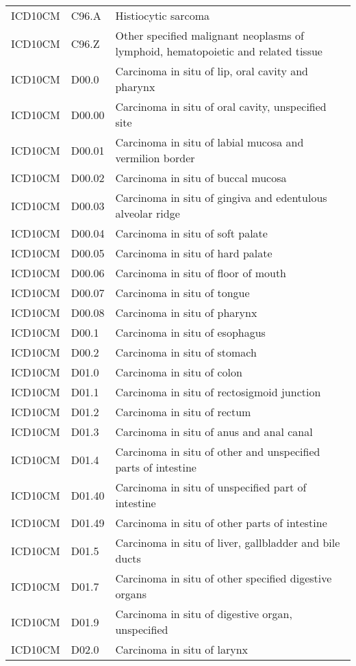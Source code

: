 \begin{longtable}{p{}p{}p{}}
  ICD10CM & C96.A & Histiocytic sarcoma \\ 
  ICD10CM & C96.Z & Other specified malignant neoplasms of lymphoid, hematopoietic and related tissue \\ 
  ICD10CM & D00.0 & Carcinoma in situ of lip, oral cavity and pharynx \\ 
  ICD10CM & D00.00 & Carcinoma in situ of oral cavity, unspecified site \\ 
  ICD10CM & D00.01 & Carcinoma in situ of labial mucosa and vermilion border \\ 
  ICD10CM & D00.02 & Carcinoma in situ of buccal mucosa \\ 
  ICD10CM & D00.03 & Carcinoma in situ of gingiva and edentulous alveolar ridge \\ 
  ICD10CM & D00.04 & Carcinoma in situ of soft palate \\ 
  ICD10CM & D00.05 & Carcinoma in situ of hard palate \\ 
  ICD10CM & D00.06 & Carcinoma in situ of floor of mouth \\ 
  ICD10CM & D00.07 & Carcinoma in situ of tongue \\ 
  ICD10CM & D00.08 & Carcinoma in situ of pharynx \\ 
  ICD10CM & D00.1 & Carcinoma in situ of esophagus \\ 
  ICD10CM & D00.2 & Carcinoma in situ of stomach \\ 
  ICD10CM & D01.0 & Carcinoma in situ of colon \\ 
  ICD10CM & D01.1 & Carcinoma in situ of rectosigmoid junction \\ 
  ICD10CM & D01.2 & Carcinoma in situ of rectum \\ 
  ICD10CM & D01.3 & Carcinoma in situ of anus and anal canal \\ 
  ICD10CM & D01.4 & Carcinoma in situ of other and unspecified parts of intestine \\ 
  ICD10CM & D01.40 & Carcinoma in situ of unspecified part of intestine \\ 
  ICD10CM & D01.49 & Carcinoma in situ of other parts of intestine \\ 
  ICD10CM & D01.5 & Carcinoma in situ of liver, gallbladder and bile ducts \\ 
  ICD10CM & D01.7 & Carcinoma in situ of other specified digestive organs \\ 
  ICD10CM & D01.9 & Carcinoma in situ of digestive organ, unspecified \\ 
  ICD10CM & D02.0 & Carcinoma in situ of larynx \\ 

\end{longtable}
